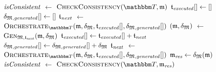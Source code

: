 \begin{algorithmic}[1]
        \State $\mathit{isConsistent}$ $\leftarrow$ $\function{CheckConsistency}(\transformationset{T}, \modeltuple{m})$
            \State \Return{$\bot$}
        \EndIf
        \State $\mathfrak{t}_{\mathit{executed}}[] \leftarrow []$
        \State $\mathfrak{\delta}_{\mathfrak{M}, \mathit{generated}}[] \leftarrow []$
        \State $\mathfrak{t}_{\mathit{next}}$ $\leftarrow$ $\function{Orchestrate}_{\transformationset{T}}(\modeltuple{m}, \changetuple{\metamodeltuple{M}}, \applyalgexecuted, \applyalggenerated)$ \label{algo:orchestration:application:line:startorchestrate}
            \State $(\mathfrak{m}, \mathfrak{\delta}_{\mathfrak{M}})$ $\leftarrow$ $\textsc{Gen}_{\mathfrak{M}, \mathfrak{t}_{\mathit{next}}}(\mathfrak{m}, \mathfrak{\delta}_{\mathfrak{M}})$ \label{algo:orchestration:application:line:stepcalculation}
            \State $\mathfrak{t}_{\mathit{executed}}[] \gets \mathfrak{t}_{\mathit{executed}}[] + \mathfrak{t}_{\mathit{next}}$
            \State $\mathfrak{\delta}_{\mathfrak{M}, \mathit{generated}}[] \gets \mathfrak{\delta}_{\mathfrak{M}, \mathit{generated}}[] + \mathfrak{\delta}_{\mathfrak{M}}$
            \State $\mathfrak{t}_{\mathit{next}}$ $\leftarrow$ $\function{Orchestrate}_{\transformationset{T}}(\modeltuple{m}, \changetuple{\metamodeltuple{M}}, \applyalgexecuted, \applyalggenerated)$
        \EndWhile \label{algo:orchestration:application:line:endorchestrate}
        \State $\mathfrak{m}_{\mathit{res}} \leftarrow \mathfrak{\delta}_{\mathfrak{M}}(\mathfrak{m})$ %
        \State $\mathit{isConsistent}$ $\leftarrow$ $\function{CheckConsistency}(\transformationset{T}, \modeltuple{m}_\mathvariable{res})$ \label{algo:orchestration:application:line:startconsistencycheck}
            \State \Return{$\bot$}
        \EndIf \label{algo:orchestration:application:line:endconsistencycheck}

\end{algorithmic}
